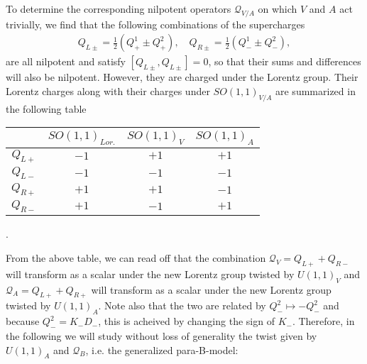 \documentclass{article}
\newcommand{\QQ}{\mathcal{Q}}
\theoremstyle{definition}
\theoremstyle{remark}
\begin{document}
To determine the corresponding nilpotent operators $\QQ_{V/A}$ on which $V$ and $A$ act trivially, we find that the following combinations of the supercharges
\begin{align*}
Q_{L\pm}=\frac{1}{2}(Q^1_+\pm Q^2_+),\quad Q_{R\pm}=\frac{1}{2}(Q^1_-\pm Q^2_-),
\end{align*}
are all nilpotent and satisfy $[Q_{L\pm},Q_{L\pm}]=0$, so that their sums and differences will also be nilpotent. However, they are charged under the Lorentz group. Their Lorentz charges along with their charges under $SO(1,1)_{V/A}$ are summarized in the following table
\bigskip
\begin{center}
\begin{tabular}{c|c c c}
		& $SO(1,1)_{Lor.}$ & $SO(1,1)_V$ & $SO(1,1)_A$\\ \hline
$Q_{L+}$& $-1$ & $+1$ & $+1$\\
$Q_{L-}$& $-1$ & $-1$ & $-1$\\
$Q_{R+}$& $+1$ & $+1$ & $-1$\\
$Q_{R-}$& $+1$ & $-1$ & $+1$
\end{tabular}.
\end{center}
\bigskip
From the above table, we can read off that the combination $\QQ_V=Q_{L+}+Q_{R-}$ will transform as a scalar under the new Lorentz group twisted by $U(1,1)_V$ and $\QQ_A=Q_{L+}+Q_{R+}$ will transform as a scalar under the new Lorentz group twisted by $U(1,1)_A$. Note also that the two are related by $Q_-^2\mapsto -Q_-^2$ and because $Q_-^2=K_-D_-$, this is acheived by changing the sign of $K_-$. Therefore, in the following we will study without loss of generality the twist given by $U(1,1)_A$ and $\QQ_B$, i.e. the generalized para-B-model:
\end{document}
